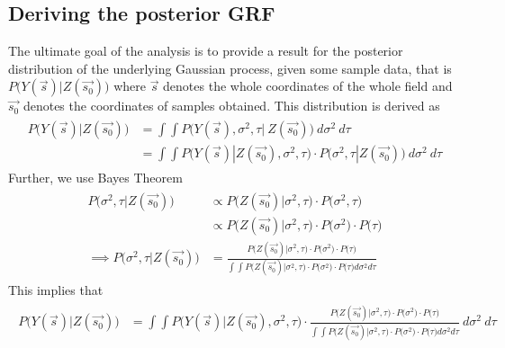 \documentclass{report}
\begin{document}
\subsection{Deriving the posterior GRF}
The ultimate goal of the analysis is to provide a result for the posterior distribution of the underlying Gaussian process, given some sample data, that is $P \big( Y(\vec{s}) | Z(\vec{s_0}) \big)$ where $\vec{s}$ denotes the whole coordinates of the whole field and $\vec{s_0}$ denotes the coordinates of samples obtained. This distribution is derived as 
\begin{align*}
\begin{split}
P \big( Y(\vec{s}) | Z(\vec{s_0}) \big) &= \int \int P \big( Y(\vec{s}), \sigma^2, \tau | \ Z(\vec{s_0}) \big) \ d\sigma^2 \ d\tau \\
&= \int \int P \big( Y(\vec{s}) | Z(\vec{s_0}), \sigma^2, \tau \big) \cdot P\big( \sigma^2, \tau | Z(\vec{s_0}) \big) \ d\sigma^2 \ d\tau 
\end{split}
\end{align*}
Further, we use Bayes Theorem 
\begin{align}\label{eq:posterior_prior}
\begin{split}
P\big( \sigma^2, \tau | Z(\vec{s_0}) \big) &\propto P\big( Z(\vec{s_0}) | \sigma^2, \tau \big) \cdot P\big( \sigma^2, \tau \big) \\
&\propto P\big( Z(\vec{s_0}) | \sigma^2, \tau \big) \cdot P\big( \sigma^2 \big) \cdot P\big( \tau \big) \\
\implies P\big( \sigma^2, \tau | Z(\vec{s_0}) \big) &= \frac{P\big( Z(\vec{s_0}) | \sigma^2, \tau \big) \cdot P\big( \sigma^2 \big) \cdot P\big( \tau \big)}{\int \int P\big( Z(\vec{s_0}) | \sigma^2, \tau \big) \cdot P\big( \sigma^2 \big) \cdot P\big( \tau \big) d\sigma^2 d\tau}
\end{split}
\end{align}
This implies that 
\begin{align}\label{eq:grf_posterior}
\begin{split}
P \big( Y(\vec{s}) | Z(\vec{s_0}) \big) &= \int \int P \big( Y(\vec{s}) | Z(\vec{s_0}), \sigma^2, \tau \big) \cdot \frac{P\big( Z(\vec{s_0}) | \sigma^2, \tau \big) \cdot P\big( \sigma^2 \big) \cdot P\big( \tau \big)}{\int \int P\big( Z(\vec{s_0}) | \sigma^2, \tau \big) \cdot P\big( \sigma^2 \big) \cdot P\big( \tau \big) d\sigma^2 d\tau} \ d\sigma^2 \ d\tau
\end{split}
\end{align}
\end{document}
